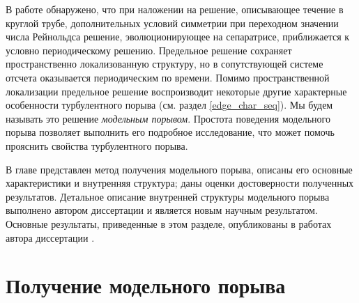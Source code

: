 В работе \cite{Avila2013} обнаружено, что при наложении на решение, описывающее течение в круглой трубе, дополнительных условий симметрии при переходном значении числа Рейнольдса решение, эволюционирующее на сепаратрисе, приближается к условно периодическому решению. Предельное решение сохраняет пространственно локализованную структуру, но в сопутствующей системе отсчета оказывается периодическим по времени. Помимо пространственной локализации предельное решение воспроизводит некоторые другие характерные особенности турбулентного порыва (см. раздел \ref{edge_char_seq}). Мы будем называть это решение {\it модельным порывом}. Простота поведения модельного порыва позволяет выполнить его подробное исследование, что может помочь прояснить свойства турбулентного порыва. 

В главе представлен метод получения модельного порыва, описаны его основные характеристики и внутренняя структура; даны оценки достоверности полученных результатов. Детальное описание внутренней структуры модельного порыва выполнено автором диссертации и является новым научным результатом. Основные результаты, приведенные в этом разделе, опубликованы в работах автора диссертации \cite{MZG2015, Kazan2015, KMU2015}. 


\section{Получение модельного порыва} \label{edge_seq}

